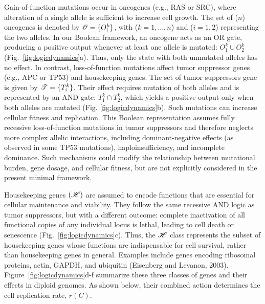 \documentclass[10pt, aps, rmp,  twocolumn, superscriptaddress, floatfix, showkeys]{revtex4-2}
\begin{document}
Gain-of-function mutations occur in oncogenes (e.g., RAS or SRC), where alteration of a single allele is sufficient to increase cell growth. The set of ($n$) oncogenes is denoted by ${\cal O}=\{O_i^k\}$, with ($k=1,\ldots,n$) and ($i=1,2$) representing the two alleles. In our Boolean framework, an oncogene acts as an OR gate, producing a positive output whenever at least one allele is mutated:
$O_1^k \cup O_2^k$ (Fig.~\ref{fig:logicdynamics}a). 
Thus, only the state with both unmutated alleles has no effect.
In contrast, loss-of-function mutations affect tumor suppressor genes (e.g., APC or TP53) and housekeeping genes. The set of tumor suppressors gene is given by 
${\cal T}=\{T_i^k\}$. Their effect requires mutation of both alleles and is represented by an AND gate: $T_1^k \cap T_2^k$,
which yields a positive output only when both alleles are mutated (Fig. \ref{fig:logicdynamics}b). Such mutations can increase cellular fitness and replication.
This Boolean representation assumes fully recessive loss-of-function mutations in tumor suppressors and therefore neglects more complex allelic interactions, including dominant-negative effects (as observed in some TP53 mutations), haploinsufficiency, and incomplete dominance. Such mechanisms could modify the relationship between mutational burden, gene dosage, and cellular fitness, but are not explicitly considered in the present minimal framework.


Housekeeping genes $({\cal H})$ are assumed to encode functions that are essential for cellular maintenance and viability. They follow the same recessive AND logic as tumor suppressors, but with a different outcome: complete inactivation of all functional copies of any individual locus is lethal, leading to cell death or senescence (Fig.~\ref{fig:logicdynamics}c). Thus, the $\cal H$ class represents the subset of housekeeping genes whose functions are indispensable for cell survival, rather than housekeeping genes in general.
Examples include genes encoding ribosomal proteins, actin, GAPDH, and ubiquitin (Eisenberg and Levanon, 2003). Figure~\ref{fig:logicdynamics}d-f summarize these three classes of genes and their effects in diploid genomes. As shown below, their combined action determines the cell replication rate, $r(C)$.
\end{document}
